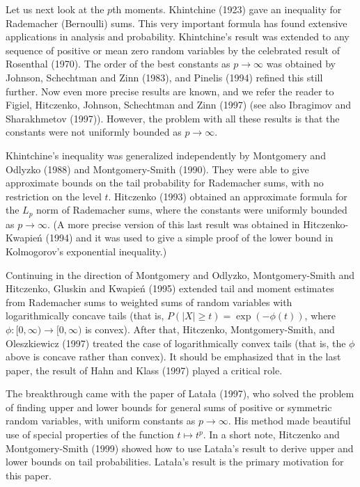 \documentclass[12pt]{article}
\newcommand{\modo}[1]{{\left|#1\right|}}
\begin{document}
Let us next look at the $p$th moments.  Khintchine (1923) gave
an inequality for Rademacher (Bernoulli) sums.  
This very important 
formula has found extensive applications in analysis and probability.
Khintchine's result was extended
to any sequence of positive or mean zero random variables by 
the celebrated result of Rosenthal (1970).
The order of the best constants as $p \to \infty$ was 
obtained by Johnson, Schechtman and Zinn (1983),
and Pinelis (1994) refined this still further.  Now even more precise
results are known, and we refer the reader to 
Figiel, Hitczenko, Johnson, Schechtman and Zinn (1997)
(see also Ibragimov and Sharakhmetov (1997)).  However, the
problem with all these results is that the constants were not uniformly
bounded as $p \to \infty$.

Khintchine's inequality was generalized independently by 
Montgomery and Odlyzko (1988) and Montgomery-Smith (1990).  They
were able to give approximate bounds on the tail probability for 
Rademacher sums, with no restriction on the level $t$.
Hitczenko (1993) obtained an approximate formula for the
$L_p$ norm of Rademacher sums, where the constants were uniformly bounded
as $p \to \infty$.  (A more 
precise version of this last result was obtained in Hitczenko-Kwapie\'n
(1994) and it was used to give a simple proof of the lower bound
in Kolmogorov's exponential inequality.) 

Continuing in the direction of Montgomery and Odlyzko, Montgomery-Smith and
Hitczenko,
Gluskin and Kwapie\'n (1995) extended tail and moment estimates
from Rademacher sums to weighted sums of random variables with
logarithmically concave tails (that is, $P(\modo{X}\ge t)=\exp(-\phi(t))$,
where 
$\phi:[0,\infty)\to[0,\infty)$ is convex).  
After that, Hitczenko, Montgomery-Smith, 
and Oleszkiewicz (1997) treated the case of logarithmically
convex tails 
(that is, the $\phi$ above is concave rather than convex). 
It should be 
emphasized that in the last paper, the result of
Hahn and Klass (1997) played a critical role.

The breakthrough came with the paper of Lata{\l}a (1997), who solved
the problem of finding upper and lower bounds for general
sums of positive or symmetric random variables, with uniform constants
as $p \to \infty$.
His method made beautiful use of special properties of the function 
$t \mapsto t^p$. 
In a short note, Hitczenko and 
Montgomery-Smith (1999) showed how to use Lata{\l}a's result to derive 
upper and lower bounds on 
tail probabilities.  Lata{\l}a's result is the primary
motivation for this paper.
\end{document}
